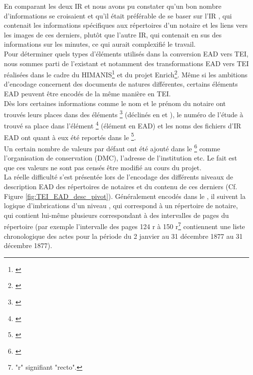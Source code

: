En comparant les deux IR  et  nous avons pu constater qu'un bon nombre d'informations se croisaient et qu'il était préférable de se baser sur l'IR , qui contenait les informations spécifiques aux répertoires d'un notaire et les liens vers les images de ces derniers, plutôt que l'autre IR, qui contenait en sus des informations sur les minutes, ce qui aurait complexifié le travail.\\

Pour déterminer quels types d'éléments utilisés dans la conversion EAD vers TEI, nous sommes parti de l'existant et notamment des transformations EAD vers TEI réalisées dans le cadre du HIMANIS\footnote{\cite{stutzmann_ead-tei_2019}} et du projet Enrich\footnote{\cite{university_of_oxford_-__bodleian_library_ead2enrich_nodate}}. Même si les ambitions d'encodage concernent des documents de natures différentes, certains éléments EAD peuvent être encodés de la même manière en TEI.\\

Dès lors certaines informations comme le nom et le prénom du notaire ont trouvés leurs places dans des éléments \footnote{\cite{tei_tei_nodate-9}} (déclinés en  et ), le numéro de l'étude à trouvé sa place dans l'élément \footnote{\cite{tei_tei_nodate-8}} (élément  en EAD) et les noms des fichiers d'IR EAD ont quant à eux été reportés dans le \footnote{\cite{tei_tei_nodate-7}}.\\

Un certain nombre de valeurs par défaut ont été ajouté dans le \footnote{\cite{tei_tei_nodate-23}} comme l'organisation de conservation (DMC), l'adresse de l'institution etc. Le fait est que ces valeurs ne sont pas censés être modifié au cours du projet.\\

La réelle difficulté s'est présentée lors de l'encodage des différents niveaux de description EAD des répertoires de notaires et du contenu de ces derniers (Cf. Figure \ref{fig:TEI_EAD_desc_pivot}). Généralement encodés dans le , il suivent la logique d'imbrications d'un niveau , qui correspond à un répertoire de notaire, qui contient lui-même plusieurs  correspondant à des intervalles de pages du répertoire (par exemple l'intervalle des pages 124 r à 150 r\footnote{"r" signifiant "recto".} contiennent une liste chronologique des actes pour la période du 2 janvier au 31 décembre 1877 au 31 décembre 1877). 

